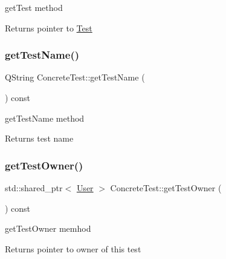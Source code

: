 get\+Test method 

\begin{DoxyReturn}{Returns}
pointer to \hyperlink{class_test}{Test} 
\end{DoxyReturn}
\mbox{\label{class_concrete_test_a204ab380ffaa5ac54e3cd25906b28cd5}} 
\subsubsection{\texorpdfstring{get\+Test\+Name()}{getTestName()}}
{\footnotesize\ttfamily Q\+String Concrete\+Test\+::get\+Test\+Name (\begin{DoxyParamCaption}{ }\end{DoxyParamCaption}) const}



get\+Test\+Name method 

\begin{DoxyReturn}{Returns}
test name 
\end{DoxyReturn}
\mbox{\label{class_concrete_test_a09e88f4984fed654de6f469515a26bcf}} 
\subsubsection{\texorpdfstring{get\+Test\+Owner()}{getTestOwner()}}
{\footnotesize\ttfamily std\+::shared\+\_\+ptr$<$ \hyperlink{class_user}{User} $>$ Concrete\+Test\+::get\+Test\+Owner (\begin{DoxyParamCaption}{ }\end{DoxyParamCaption}) const}



get\+Test\+Owner memhod 

\begin{DoxyReturn}{Returns}
pointer to owner of this test 
\end{DoxyReturn}
\mbox{\label{class_concrete_test_af8d78edb5c195117a73b7fb84001893b}} 
